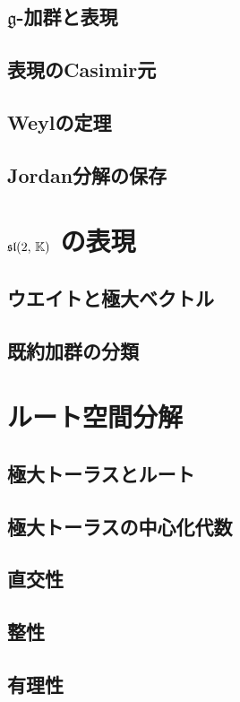 \documentclass[rep_main]{subfiles}
\begin{document}
\subsection{$\mathfrak{g}$-加群と表現}
\subsection{表現のCasimir元}
\subsection{Weylの定理}
\subsection{Jordan分解の保存}

\section{$\mathfrak{sl}(2,\, \mathbb{K})$ の表現}

\subsection{ウエイトと極大ベクトル}
\subsection{既約加群の分類}

\section{ルート空間分解}

\subsection{極大トーラスとルート}
\subsection{極大トーラスの中心化代数}
\subsection{直交性}
\subsection{整性}
\subsection{有理性}
\end{document}
